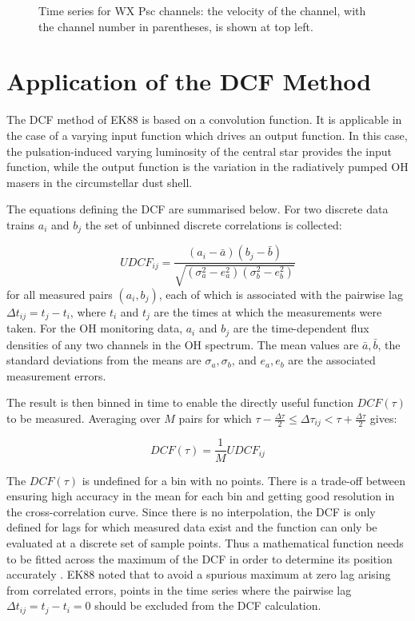 \documentclass[usenatbib,usegraphicx]{mn2e}
\begin{document}
\begin{figure*}
\caption{Time series for WX Psc channels: 
the velocity of the channel, with the channel number in
parentheses, is shown at top left.}
\label{fig:wxtsalp}
\end{figure*}



\section{Application of the DCF Method}

The DCF method of EK88 is based on a convolution function.  It is applicable
in the case of a varying input function which drives an output function.  In
this case, the pulsation-induced varying luminosity of the central star
provides the input function, while the output function is the variation in
the radiatively pumped OH masers in the circumstellar dust shell.

The equations defining the DCF are summarised below.  
For two discrete data trains $a_{i}$ and $b_{j}$ the set of unbinned
discrete correlations is collected:

\begin{equation}
UDCF_{ij} = \frac{(a_{i}-\bar{a})(b_{j}-\bar{b})}
            {\sqrt{(\sigma^{2}_{a}-e^{2}_{a})(\sigma^{2}_{b}-e^{2}_{b})}} 
\end{equation}
for all measured pairs $(a_{i},b_{j})$, each of which is associated with the
pairwise lag $\Delta t_{ij} = t_{j} - t_{i}$, where $t_{i}$ and $t_{j}$ are
the times at which the measurements were taken.  For the OH monitoring data,
$a_{i}$ and $b_{j}$ are the time-dependent flux densities of any two
channels in the OH spectrum.  The mean values are $\bar{a}, \bar{b}$,
the standard deviations from the means are $\sigma_{a}, \sigma_{b}$, and
$e_{a}, e_{b}$ are the associated measurement errors.

The result is then binned in time to enable the directly useful function
$DCF(\tau)$ to be measured.  Averaging over $M$ pairs for which $\tau-
\frac{\Delta\tau}{2} \leq \Delta\tau_{ij} < \tau+\frac{\Delta\tau}{2}$
gives:

\begin{equation}
DCF(\tau) = \frac{1}{M}UDCF_{ij}
\end{equation}

The $DCF(\tau)$ is undefined for a bin with no points.  There is a trade-off
between ensuring high accuracy in the mean for each bin and getting good
resolution in the cross-correlation curve.  Since there is no interpolation,
the DCF is only defined for lags for which measured data exist and the
function can only be evaluated at a discrete set of sample points.  Thus a
mathematical function needs to be fitted across the maximum of the DCF in
order to determine its position accurately \citep[eg.][]{Lehar92}.  EK88
noted that to avoid a spurious maximum at zero lag arising from correlated
errors, points in the time series where the pairwise lag $\Delta t_{ij} =
t_{j} - t_{i} = 0$ should be excluded from the DCF calculation.
\end{document}
